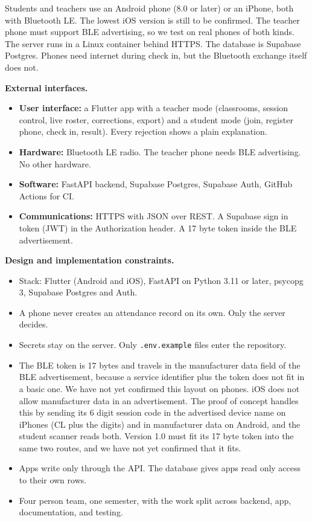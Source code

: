 Students and teachers use an Android phone (8.0 or later) or an iPhone, both with Bluetooth LE. The lowest iOS version is still to be confirmed. The teacher phone must support BLE advertising, so we test on real phones of both kinds. The server runs in a Linux container behind HTTPS. The database is Supabase Postgres. Phones need internet during check in, but the Bluetooth exchange itself does not.

\textbf{External interfaces.}

\begin{itemize}
\tightlist
\item
  \textbf{User interface:} a Flutter app with a teacher mode (classrooms, session control, live roster, corrections, export) and a student mode (join, register phone, check in, result). Every rejection shows a plain explanation.
\item
  \textbf{Hardware:} Bluetooth LE radio. The teacher phone needs BLE advertising. No other hardware.
\item
  \textbf{Software:} FastAPI backend, Supabase Postgres, Supabase Auth, GitHub Actions for CI.
\item
  \textbf{Communications:} HTTPS with JSON over REST. A Supabase sign in token (JWT) in the Authorization header. A 17 byte token inside the BLE advertisement.
\end{itemize}

\textbf{Design and implementation constraints.}

\begin{itemize}
\tightlist
\item
  Stack: Flutter (Android and iOS), FastAPI on Python 3.11 or later, psycopg 3, Supabase Postgres and Auth.
\item
  A phone never creates an attendance record on its own. Only the server decides.
\item
  Secrets stay on the server. Only \texttt{.env.example} files enter the repository.
\item
  The BLE token is 17 bytes and travels in the manufacturer data field of the BLE advertisement, because a service identifier plus the token does not fit in a basic one. We have not yet confirmed this layout on phones. iOS does not allow manufacturer data in an advertisement. The proof of concept handles this by sending its 6 digit session code in the advertised device name on iPhones (CL plus the digits) and in manufacturer data on Android, and the student scanner reads both. Version 1.0 must fit its 17 byte token into the same two routes, and we have not yet confirmed that it fits.
\item
  Apps write only through the API. The database gives apps read only access to their own rows.
\item
  Four person team, one semester, with the work split across backend, app, documentation, and testing.
\end{itemize}

